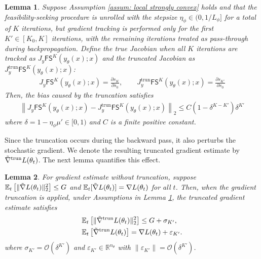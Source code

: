 \documentclass{article}
\def\R{\mathbb{R}}
\def\E{\mathbb{E}}
\def\FS{\mathsf{FS}}
\def\tgrad{\Tilde{\nabla}}
\newcommand{\bigO}{\mathcal{O}}
\newtheorem{lemma}{Lemma}
\def\x{x}
\def\y{y_{\theta}}   \def\hy{\hat{y}_{\theta}}    \def\ty{\Tilde{y}}
\begin{document}
\begin{lemma}\label{lemma: Jac error}
    Suppose Assumption \ref{assum: local strongly convex} holds and that the feasibility-seeking procedure is unrolled with the stepsize $\eta_\phi \in (0, 1/L_\phi]$ for a total of $K$ iterations, but gradient tracking is performed only for the first $K' \in [K_0, K]$ iterations, with the remaining iterations treated as pass-through during backpropagation. Define the true Jacobian when all $K$ iterations are tracked as $J_y \FS^K(\y(\x); \x)$ and the truncated Jacobian as $J_y^\mathrm{trun} \FS^K(\y(\x);\x)$: 
    \begin{align*}
        J_y \FS^K(\y(\x); \x)  = \frac{\partial s_K}{\partial s_0}, \qquad
        J_y^\mathrm{trun} \FS^K(\y(\x);\x)  = \frac{\partial s_{K'}}{\partial s_0}        
    \end{align*}    
    Then, the bias caused by the truncation satisfies 
    \begin{align*}
        \left\| J_y \FS^K(\y(\x); \x) -  J_y^\mathrm{trun} \FS^K(\y(\x);\x) \right\|_2 \leq C(1 - \delta^{K-K'}) \delta^{K'}
    \end{align*}
    where $\delta = 1- \eta_\phi \mu' \in [0,1)$ and $C$ is a finite positive constant.
\end{lemma}

Since the truncation occurs during the backward pass, it also perturbs the stochastic gradient. 
We denote the resulting truncated gradient estimate by $\tgrad^\mathrm{trun} L(\theta_t)$.
The next lemma quantifies this effect.
\begin{lemma} \label{lemma: bounded grad est error}
    For gradient estimate without truncation, suppose $\mathbb{E}_t \left[ \| \tgrad L(\theta_t) \|^2_2 \right] \leq G$ and $\E_t[\tgrad L(\theta_t)] = \nabla L(\theta_t)$ for all $t$. Then, when the gradient truncation is applied, under Assumptions in Lemma \ref{lemma: Jac error}, the truncated gradient estimate satisfies 
    \begin{align*}
        &\E_t \left[\| \tgrad^\mathrm{trun} L(\theta_t) \|^2_2\right] \leq G + \sigma_{K'}, \\
        &\E_t\left[ \tgrad^\mathrm{trun} L(\theta_t) \right] = \nabla L(\theta_t) + \varepsilon_{K'}.
    \end{align*}
    where $\sigma_{K'} = \bigO(\delta^{K'})$ and $\varepsilon_{K'} \in \R^{n_\theta}$ with $\|\varepsilon_{K'} \|= \bigO(\delta^{K'})$.
\end{lemma}
\end{document}
